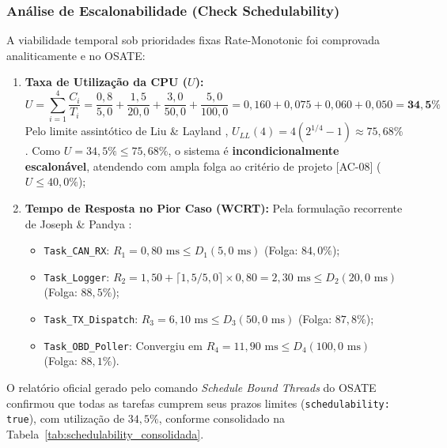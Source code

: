 \subsubsection{Análise de Escalonabilidade (Check Schedulability)}
A viabilidade temporal sob prioridades fixas Rate-Monotonic foi comprovada analiticamente e no OSATE:
\begin{enumerate}
    \item \textbf{Taxa de Utilização da CPU ($U$):}
    \begin{equation}
    U = \sum_{i=1}^{4} \frac{C_i}{T_i} = \frac{0{,}8}{5{,}0} + \frac{1{,}5}{20{,}0} + \frac{3{,}0}{50{,}0} + \frac{5{,}0}{100{,}0} = 0{,}160 + 0{,}075 + 0{,}060 + 0{,}050 = \mathbf{34{,}5\%}
    \end{equation}
    Pelo limite assintótico de Liu \& Layland \cite{liulayland1973}, $U_{LL}(4) = 4(2^{1/4}-1) \approx 75{,}68\%$. Como $U = 34{,}5\% \le 75{,}68\%$, o sistema é \textbf{incondicionalmente escalonável}, atendendo com ampla folga ao critério de projeto [AC-08] ($U \le 40{,}0\%$);
    \item \textbf{Tempo de Resposta no Pior Caso (WCRT):} Pela formulação recorrente de Joseph \& Pandya \cite{josephpandya1986}:
    \begin{itemize}
        \item \texttt{Task\_CAN\_RX}: $R_1 = 0{,}80\text{ ms} \le D_1 (5{,}0\text{ ms})$ (Folga: $84{,}0\%$);
        \item \texttt{Task\_Logger}: $R_2 = 1{,}50 + \lceil 1{,}5/5{,}0 \rceil \times 0{,}80 = 2{,}30\text{ ms} \le D_2 (20{,}0\text{ ms})$ (Folga: $88{,}5\%$);
        \item \texttt{Task\_TX\_Dispatch}: $R_3 = 6{,}10\text{ ms} \le D_3 (50{,}0\text{ ms})$ (Folga: $87{,}8\%$);
        \item \texttt{Task\_OBD\_Poller}: Convergiu em $R_4 = 11{,}90\text{ ms} \le D_4 (100{,}0\text{ ms})$ (Folga: $88{,}1\%$).
    \end{itemize}
\end{enumerate}

O relatório oficial gerado pelo comando \textit{Schedule Bound Threads} do OSATE confirmou que todas as tarefas cumprem seus prazos limites (\texttt{schedulability: true}), com utilização de $34{,}5\%$, conforme consolidado na Tabela~\ref{tab:schedulability_consolidada}.



